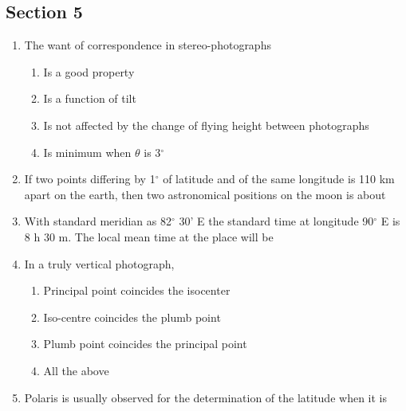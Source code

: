 \documentclass[11pt,a4paper]{article}
\begin{document}
\subsection*{Section 5}
\begin{enumerate}
\item{The want of correspondence in stereo-photographs}
\begin{enumerate}[label=\Alph*.]
\item{Is a good property}
\item{Is a function of tilt}
\item{Is not affected by the change of flying height between photographs}
\item{Is minimum when $\theta$ is 3$^\circ$}
\end{enumerate}
\item{If two points differing by 1$^\circ$ of latitude and of the same longitude is 110 km apart on the earth, then two astronomical positions on the moon is about
}
\\
\item{With standard meridian as 82$^\circ$ 30' E the standard time at longitude 90$^\circ$ E is 8 h 30 m. The local mean time at the place will be
}
\\
\item{In a truly vertical photograph,}
\begin{enumerate}[label=\Alph*.]
\item{Principal point coincides the isocenter}
\item{Iso-centre coincides the plumb point}
\item{Plumb point coincides the principal point}
\item{All the above}
\end{enumerate}
\item{Polaris is usually observed for the determination of the latitude when it is}

\end{enumerate}
\end{document}
